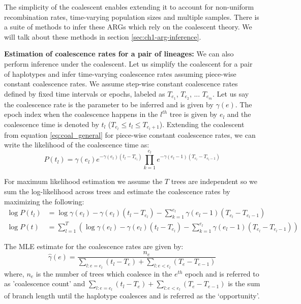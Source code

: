 The simplicity of the coalescent enables extending it to account for non-uniform recombination rates, time-varying population sizes and multiple samples. There is a suite of methods to infer these ARGs which rely on the coalescent theory. We will talk about these methods in section \ref{sec:ch1-arg-inference}.

\textbf{Estimation of coalescence rates for a pair of lineages:} We can also perform inference under the coalescent. Let us simplify the coalescent for a pair of haplotypes and infer time-varying coalescence rates assuming piece-wise constant coalescence rates. We assume step-wise constant coalescence rates defined by fixed time intervals or epochs, labeled as $T_{e_1}$,  $T_{e_2}$, ... $T_{e_m}$. Let us say the coalescence rate is the parameter to be inferred and is given by $\gamma(e)$. The epoch index when the coalescence happens in the $l^{th}$ tree is given by $e_l$ and  the coalescence time is denoted by $t_l$ ($T_{e_l} \leq t_l \leq T_{e_l + 1} $). Extending the coalescent from equation \ref{eq:coal_general} for piece-wise constant coalescence rates, we can write the likelihood of the coalescence time as:
\begin{equation}
    P(t_l) = \gamma(e_l) e^{  -\gamma(e_l) (t_l - T_{e_l}) } \prod_{k=1}^{e_l} e ^{  -\gamma(e_l - 1) (T_{e_l} - T_{e_l-1}) } 
\end{equation}

For maximum likelihood estimation we assume the $T$ trees are independent so we sum the log-likelihood across trees and estimate the coalescence rates by maximizing the following:
\begin{align}
    \log P(t_l) &= \log \gamma(e_l)  -\gamma(e_l) (t_l - T_{e_l}) - \sum_{k=1}^{e_l} \gamma(e_l - 1) (T_{e_l} - T_{e_l-1}) \nonumber \\
    \log P(t) &= \sum_{l=1}^{T} \left( \log \gamma(e_l)  -\gamma(e_l) (t_l - T_{e_l}) - \sum_{k=1}^{e_l} \gamma(e_l - 1) (T_{e_l} - T_{e_l-1}) \right)
\end{align}

The MLE estimate for the coalescence rates are given by: 
\begin{equation}
    \hat{\gamma}(e) = \frac{n_e}{\sum_{l:e=e_l} (t_l - T_e) +  \sum_{l:e<e_l} (T_e - T_{e-1})}
\end{equation}
where, $n_e$ is the number of trees which coalesce in the $e^{th}$ epoch and is referred to as 'coalescence count' and $\sum_{l:e=e_l} (t_l - T_e) +  \sum_{l:e<e_l} (T_e - T_{e-1})$ is the sum of branch length until the haplotype coalesces and is referred as the `opportunity'. 


